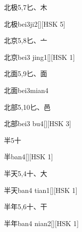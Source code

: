 \begin{entry}{北极}{5,7}{⼔、⽊}
  \begin{phonetics}{北极}{bei3ji2}[][HSK 5]
  \end{phonetics}
\end{entry}

\begin{entry}{北京}{5,8}{⼔、⼇}
  \begin{phonetics}{北京}{bei3 jing1}[][HSK 1]
  \end{phonetics}
\end{entry}

\begin{entry}{北面}{5,9}{⼔、⾯}
  \begin{phonetics}{北面}{bei3mian4}
  \end{phonetics}
\end{entry}

\begin{entry}{北部}{5,10}{⼔、⾢}
  \begin{phonetics}{北部}{bei3 bu4}[][HSK 3]
  \end{phonetics}
\end{entry}

\begin{entry}{半}{5}{⼗}
  \begin{phonetics}{半}{ban4}[][HSK 1]
  \end{phonetics}
\end{entry}

\begin{entry}{半天}{5,4}{⼗、⼤}
  \begin{phonetics}{半天}{ban4 tian1}[][HSK 1]
  \end{phonetics}
\end{entry}

\begin{entry}{半年}{5,6}{⼗、⼲}
  \begin{phonetics}{半年}{ban4 nian2}[][HSK 1]
  \end{phonetics}
\end{entry}

